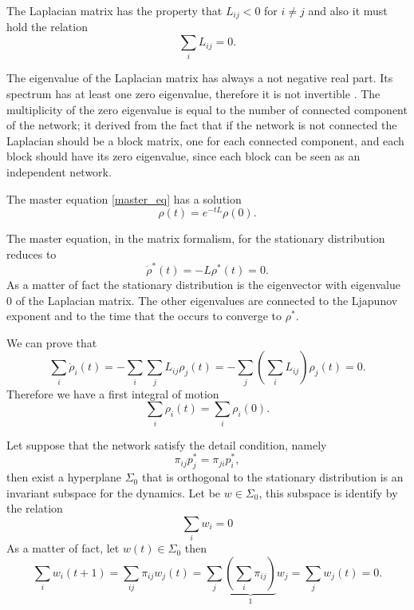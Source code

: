 The Laplacian matrix has the property that $L_{ij} < 0 $ for $i \neq j$ and also it must hold the relation
\begin{equation}
    \sum_i L_{ij} = 0 .
\end{equation} 

The eigenvalue of the Laplacian matrix has always a not negative real part.
Its spectrum has at least one zero eigenvalue, therefore it is not invertible \cite{Boccaletti}. The multiplicity of the zero eigenvalue is equal to the number of connected component of the network; it derived from the fact that if the network is not connected the Laplacian should be a block matrix, one for each connected component, and each block should have its zero eigenvalue, since each block can be seen as an independent network.

The master equation \eqref{master_eq} has a solution
\begin{equation}\label{random_walk_solution}
    \rho(t) = e^{-tL}\rho(0).
\end{equation}

The master equation, in the matrix formalism, for the stationary distribution reduces to 
\begin{equation}\label{stationary_distribution}
    \dot \rho^*(t) = -L \rho^*(t) = 0 . 
\end{equation}
As a matter of fact the stationary distribution is the eigenvector with eigenvalue $0$ of the Laplacian matrix. The other eigenvalues are connected to the Ljapunov exponent and to the time that the occurs to converge to $\rho^*$.

We can prove that
\begin{equation}
    \sum_i \dot\rho_i(t) = - \sum_i \sum_j L_{ij} \rho_j(t) = - \sum_j \left(\sum_i L_{ij}\right) \rho_j(t) = 0 .
\end{equation}
Therefore we have a first integral of motion 
\begin{equation}
    \sum_i \rho_i(t) = \sum_i \rho_i(0) .
\end{equation}


Let suppose that the network satisfy the detail condition, namely
\begin{equation}
    \pi_{ij}p^*_j = \pi_{ji}p^*_i,
\end{equation}
then exist a hyperplane $\Sigma_0$ that is orthogonal to the stationary distribution is an invariant subspace for the dynamics. Let be $w \in \Sigma_0$, this subspace is identify by the relation
\begin{equation}
    \sum_i w_i = 0 
\end{equation}
As a matter of fact, let $w(t) \in \Sigma_0$ then 
\begin{equation}
    \sum_i w_i(t+1) = \sum_{ij} \pi_{ij} w_j(t) = \sum_j \underbrace{\left(\sum_i \pi_{ij}\right)}_{1} w_j = \sum_j w_j(t) = 0.
\end{equation}


